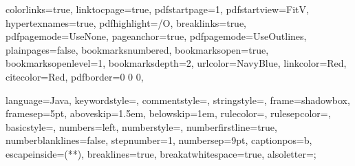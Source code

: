 \graphicspath{{figures/}{../figures/}}

\hypersetup %
{
	colorlinks=true,
	linktocpage=true, 
	pdfstartpage=1,
	pdfstartview=FitV,
	hypertexnames=true,
	pdfhighlight=/O,
	breaklinks=true,
	pdfpagemode=UseNone,
	pageanchor=true,
	pdfpagemode=UseOutlines,
	plainpages=false,
	bookmarksnumbered,
	bookmarksopen=true,
	bookmarksopenlevel=1,
	bookmarksdepth=2,
	urlcolor=NavyBlue,
	linkcolor=Red,
	citecolor=Red,
	pdfborder={0 0 0},
}

\lstset %
{
	language=Java,
	keywordstyle=\color{RoyalBlue},
    commentstyle=\color{Green}\ttfamily,
    stringstyle=\color{Red}\ttfamily,
	frame=shadowbox,
	framesep=5pt,
	aboveskip=1.5em,
	belowskip=1em,
	rulecolor=\color{blue!40!black},
	rulesepcolor=\color{white!93!black},
	basicstyle=\ttfamily\normalsize,
	numbers=left,
	numberstyle=\tiny,
	numberfirstline=true,
	numberblanklines=false,
	stepnumber=1,
	numbersep=9pt,	
	captionpos=b,
	escapeinside={(*}{*)},
	breaklines=true,
	breakatwhitespace=true,
	alsoletter={;}
}

\usetikzlibrary{positioning,fit,calc,shapes,arrows,external,petri}

